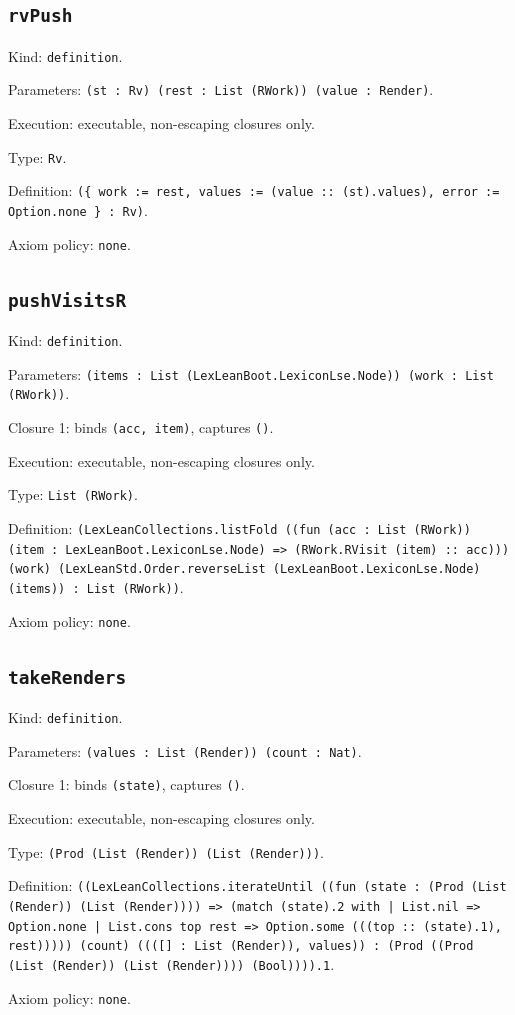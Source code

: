 \documentclass[11pt]{article}
\begin{document}
\subsection*{\texttt{rvPush}}
\noindent Kind: \texttt{definition}.\par
\noindent Parameters: \texttt{(st : Rv) (rest : List (RWork)) (value : Render)}.\par
\noindent Execution: executable, non-escaping closures only.\par
\noindent Type: \texttt{Rv}.\par
\noindent Definition: \texttt{(\{ work := rest, values := (value :: (st).values), error := Option.none \} : Rv)}.\par
\noindent Axiom policy: \texttt{none}.\par
\subsection*{\texttt{pushVisitsR}}
\noindent Kind: \texttt{definition}.\par
\noindent Parameters: \texttt{(items : List (LexLeanBoot.LexiconLse.Node)) (work : List (RWork))}.\par
\noindent Closure 1: binds \texttt{(acc, item)}, captures \texttt{()}.\par
\noindent Execution: executable, non-escaping closures only.\par
\noindent Type: \texttt{List (RWork)}.\par
\noindent Definition: \texttt{(LexLeanCollections.listFold ((fun (acc : List (RWork)) (item : LexLeanBoot.LexiconLse.Node) => (RWork.RVisit (item) :: acc))) (work) (LexLeanStd.Order.reverseList (LexLeanBoot.LexiconLse.Node) (items)) : List (RWork))}.\par
\noindent Axiom policy: \texttt{none}.\par
\subsection*{\texttt{takeRenders}}
\noindent Kind: \texttt{definition}.\par
\noindent Parameters: \texttt{(values : List (Render)) (count : Nat)}.\par
\noindent Closure 1: binds \texttt{(state)}, captures \texttt{()}.\par
\noindent Execution: executable, non-escaping closures only.\par
\noindent Type: \texttt{(Prod (List (Render)) (List (Render)))}.\par
\noindent Definition: \texttt{((LexLeanCollections.iterateUntil ((fun (state : (Prod (List (Render)) (List (Render)))) => (match (state).2 with | List.nil => Option.none | List.cons top rest => Option.some (((top :: (state).1), rest))))) (count) ((([] : List (Render)), values)) : (Prod ((Prod (List (Render)) (List (Render)))) (Bool)))).1}.\par
\noindent Axiom policy: \texttt{none}.\par
\end{document}
